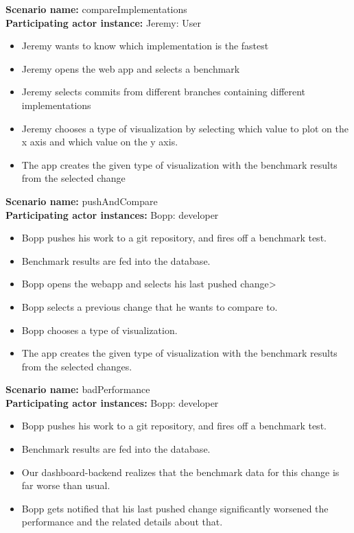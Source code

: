 \documentclass[parskip=full,11pt]{scrartcl}
\begin{document}
\textbf{Scenario name:} compareImplementations \\
\textbf{Participating actor instance:} Jeremy: User
\begin{itemize}
	\item Jeremy wants to know which implementation is the fastest
	\item Jeremy opens the web app and selects a benchmark
	\item Jeremy selects commits from different branches containing different implementations
	\item Jeremy chooses a type of visualization by selecting which value to plot on the x axis and which value on the y axis.
	\item The app creates the given type of visualization with the benchmark results from the selected change
\end{itemize}

\textbf{Scenario name:} pushAndCompare \\
\textbf{Participating actor instances:} Bopp: \gls{developer}
\begin{itemize}
	\item Bopp pushes his work to a git repository, and fires off a benchmark test.
	\item Benchmark results are fed into the database.
	\item Bopp opens the webapp and selects his last pushed change>
	\item Bopp selects a previous change that he wants to compare to.
	\item Bopp chooses a type of visualization.
	\item The app creates the given type of visualization with the benchmark results from the selected changes.
\end{itemize}

\textbf{Scenario name:} badPerformance \\
\textbf{Participating actor instances:} Bopp: \gls{developer}
\begin{itemize}
	\item Bopp pushes his work to a git repository, and fires off a benchmark test.
	\item Benchmark results are fed into the database.
	\item Our dashboard-backend realizes that the benchmark data for this change is far worse than usual.
	\item Bopp gets notified that his last pushed change significantly worsened the performance and the related details about that.
\end{itemize}
\end{document}
